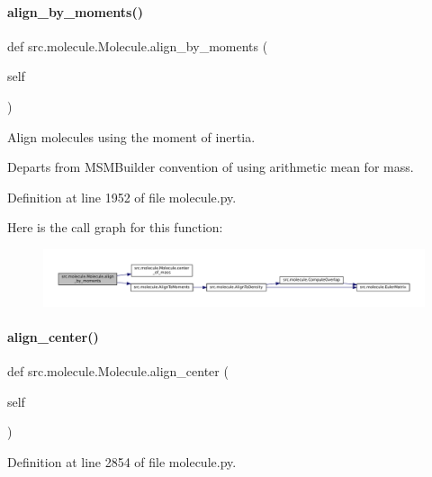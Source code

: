 \paragraph{\texorpdfstring{align\+\_\+by\+\_\+moments()}{align\_by\_moments()}}
{\footnotesize\ttfamily def src.\+molecule.\+Molecule.\+align\+\_\+by\+\_\+moments (\begin{DoxyParamCaption}\item[{}]{self }\end{DoxyParamCaption})}



Align molecules using the moment of inertia. 

Departs from M\+S\+M\+Builder convention of using arithmetic mean for mass. 

Definition at line 1952 of file molecule.\+py.

Here is the call graph for this function\+:
\nopagebreak
\begin{figure}[H]
\begin{center}
\leavevmode
\includegraphics[width=350pt]{classsrc_1_1molecule_1_1Molecule_a73446a192061fe52b26899005e3bbc31_cgraph}
\end{center}
\end{figure}
\mbox{\label{classsrc_1_1molecule_1_1Molecule_a42c302c3f922e6f89862f2e5d39514a6}} 
\paragraph{\texorpdfstring{align\+\_\+center()}{align\_center()}}
{\footnotesize\ttfamily def src.\+molecule.\+Molecule.\+align\+\_\+center (\begin{DoxyParamCaption}\item[{}]{self }\end{DoxyParamCaption})}



Definition at line 2854 of file molecule.\+py.

